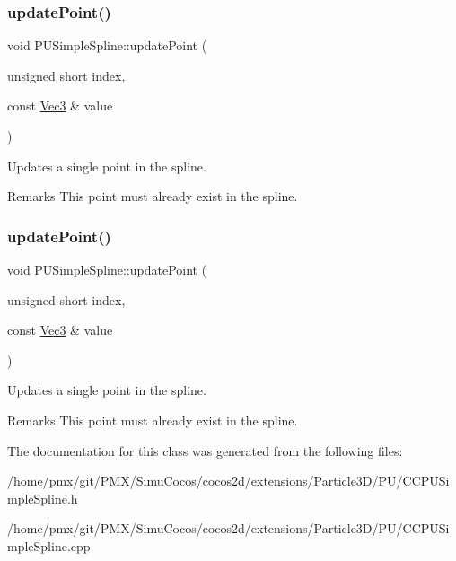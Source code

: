 \subsubsection{\texorpdfstring{update\+Point()}{updatePoint()}\hspace{0.1cm}{\footnotesize\ttfamily [1/2]}}
{\footnotesize\ttfamily void P\+U\+Simple\+Spline\+::update\+Point (\begin{DoxyParamCaption}\item[{unsigned short}]{index,  }\item[{const \hyperlink{classVec3}{Vec3} \&}]{value }\end{DoxyParamCaption})}

Updates a single point in the spline. \begin{DoxyRemark}{Remarks}
This point must already exist in the spline. 
\end{DoxyRemark}
\mbox{\label{classPUSimpleSpline_afb05b4a7e2bc40bd6dacc18c1d978fe2}} 
\subsubsection{\texorpdfstring{update\+Point()}{updatePoint()}\hspace{0.1cm}{\footnotesize\ttfamily [2/2]}}
{\footnotesize\ttfamily void P\+U\+Simple\+Spline\+::update\+Point (\begin{DoxyParamCaption}\item[{unsigned short}]{index,  }\item[{const \hyperlink{classVec3}{Vec3} \&}]{value }\end{DoxyParamCaption})}

Updates a single point in the spline. \begin{DoxyRemark}{Remarks}
This point must already exist in the spline. 
\end{DoxyRemark}


The documentation for this class was generated from the following files\+:\begin{DoxyCompactItemize}
\item 
/home/pmx/git/\+P\+M\+X/\+Simu\+Cocos/cocos2d/extensions/\+Particle3\+D/\+P\+U/C\+C\+P\+U\+Simple\+Spline.\+h\item 
/home/pmx/git/\+P\+M\+X/\+Simu\+Cocos/cocos2d/extensions/\+Particle3\+D/\+P\+U/C\+C\+P\+U\+Simple\+Spline.\+cpp\end{DoxyCompactItemize}
